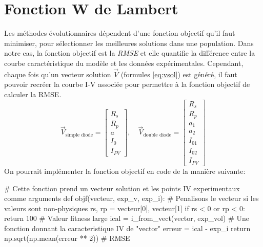 \section{Fonction W de Lambert}
Les méthodes évolutionnaires dépendent d'une fonction objectif qu'il faut minimiser, pour sélectionner les meilleures solutions dans une population. Dans notre cas, la fonction objectif est la \textit{RMSE}  et elle quantifie la différence entre la courbe caractéristique du modèle et les données expérimentales. Cependant, chaque fois qu'un vecteur solution $\vec{V}$ (formules \ref{eq:vsol}) est généré, il faut pouvoir recréer la courbe I-V associée pour permettre à la fonction objectif de calculer la RMSE.
\begin{equation}
  \label{eq:vsol}
  \vec{V}_{\text{simple diode}} = 
  \begin{bmatrix}
    R_s\\
    R_{p}\\
    a\\
    I_0\\
    I_{PV}
  \end{bmatrix},
  \quad
  \vec{V}_{\text{double diode}} = 
  \begin{bmatrix}
    R_s\\
    R_{p}\\
    a_1\\
    a_2\\
    I_{01}\\
    I_{02}\\
    I_{PV}
  \end{bmatrix}
\end{equation}
On pourrait implémenter la fonction objectif en code de la manière suivante:
\begin{python}
# Cette fonction prend un vecteur solution et les points IV experimentaux comme arguments
def objf(vecteur, exp_v, exp_i):
    # Penalisons le vecteur si les valeurs sont non-physiques
    rs, rp = vecteur[0], vecteur[1]
    if rs < 0 or rp < 0:
        return 100 # Valeur fitness large
    ical = i_from_vect(vector, exp_vol) # Une fonction donnant la caracteristique IV de "vector"
    erreur = ical - exp_i
    return np.sqrt(np.mean(erreur ** 2)) # RMSE  
\end{python}

